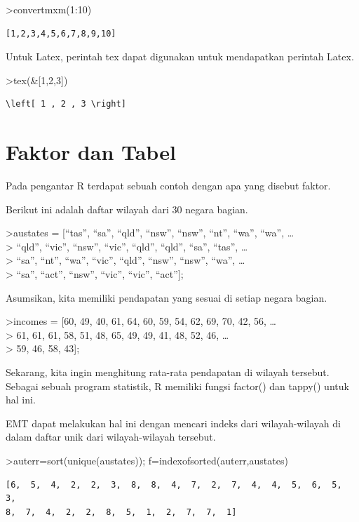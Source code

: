 \documentclass[
]{book}
\begin{document}
\textgreater convertmxm(1:10)

\begin{verbatim}
[1,2,3,4,5,6,7,8,9,10]
\end{verbatim}

Untuk Latex, perintah tex dapat digunakan untuk mendapatkan perintah Latex.

\textgreater tex(\&{[}1,2,3{]})

\begin{verbatim}
\left[ 1 , 2 , 3 \right] 
\end{verbatim}

\section{Faktor dan Tabel}\label{faktor-dan-tabel}

Pada pengantar R terdapat sebuah contoh dengan apa yang disebut faktor.

Berikut ini adalah daftar wilayah dari 30 negara bagian.

\textgreater austates = {[}``tas'', ``sa'', ``qld'', ``nsw'', ``nsw'', ``nt'', ``wa'', ``wa'', \ldots{}\\
\textgreater{} ``qld'', ``vic'', ``nsw'', ``vic'', ``qld'', ``qld'', ``sa'', ``tas'', \ldots{}\\
\textgreater{} ``sa'', ``nt'', ``wa'', ``vic'', ``qld'', ``nsw'', ``nsw'', ``wa'', \ldots{}\\
\textgreater{} ``sa'', ``act'', ``nsw'', ``vic'', ``vic'', ``act''{]};

Asumsikan, kita memiliki pendapatan yang sesuai di setiap negara bagian.

\textgreater incomes = {[}60, 49, 40, 61, 64, 60, 59, 54, 62, 69, 70, 42, 56, \ldots{}\\
\textgreater{} 61, 61, 61, 58, 51, 48, 65, 49, 49, 41, 48, 52, 46, \ldots{}\\
\textgreater{} 59, 46, 58, 43{]};

Sekarang, kita ingin menghitung rata-rata pendapatan di wilayah tersebut. Sebagai sebuah program statistik, R memiliki fungsi factor() dan tappy() untuk hal ini.

EMT dapat melakukan hal ini dengan mencari indeks dari wilayah-wilayah di dalam daftar unik dari wilayah-wilayah tersebut.

\textgreater auterr=sort(unique(austates)); f=indexofsorted(auterr,austates)

\begin{verbatim}
[6,  5,  4,  2,  2,  3,  8,  8,  4,  7,  2,  7,  4,  4,  5,  6,  5,  3,
8,  7,  4,  2,  2,  8,  5,  1,  2,  7,  7,  1]
\end{verbatim}
\end{document}
